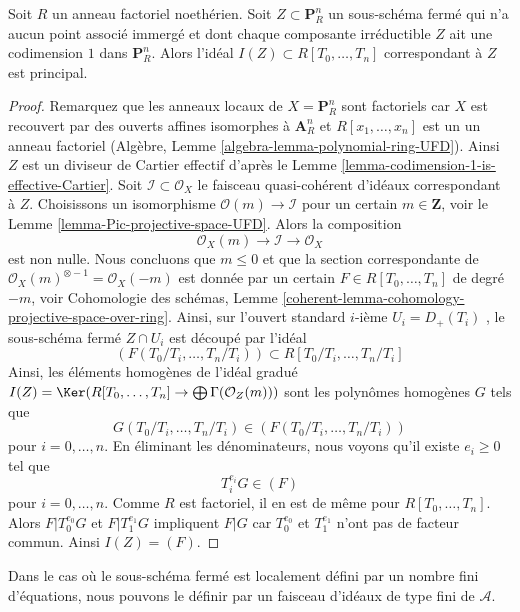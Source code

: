 \begin{lemma}
\label{lemma-equation-codim-1-in-projective-space}
Soit  $R$  un anneau factoriel noethérien. Soit  $Z \subset \mathbf{P}^n_R$  un sous-schéma fermé qui
n'a aucun point associé immergé et dont chaque composante irréductible
 $Z$  ait une codimension  $1$  dans  $\mathbf{P}^n_R$. Alors l'idéal
 $I(Z) \subset R[T_0, \ldots, T_n]$  correspondant à  $Z$  est principal.
\end{lemma}

\begin{proof}
Remarquez que les anneaux locaux de  $X = \mathbf{P}^n_R$  sont factoriels car  $X$  est
recouvert par des ouverts affines isomorphes à  $\mathbf{A}^n_R$  et  $R[x_1, \ldots, x_n]$  est un
un anneau factoriel (Algèbre, Lemme  \ref{algebra-lemma-polynomial-ring-UFD}). Ainsi  $Z$  est un diviseur de Cartier
effectif d'après le Lemme  \ref{lemma-codimension-1-is-effective-Cartier}. Soit  $\mathcal{I} \subset \mathcal{O}_X$  le faisceau
quasi-cohérent d'idéaux correspondant à  $Z$. Choisissons un isomorphisme
 $\mathcal{O}(m) \to \mathcal{I}$  pour un certain  $m \in \mathbf{Z}$, voir le Lemme  \ref{lemma-Pic-projective-space-UFD}. Alors la
composition
$$
\mathcal{O}_X(m) \to \mathcal{I} \to \mathcal{O}_X
$$
est non nulle. Nous concluons que  $m \leq 0$  et que la section correspondante de
 $\mathcal{O}_X(m)^{\otimes -1} = \mathcal{O}_X(-m)$  est donnée par un certain  $F \in R[T_0, \ldots, T_n]$  de degré  $-m$, voir
Cohomologie des schémas, Lemme  \ref{coherent-lemma-cohomology-projective-space-over-ring}. Ainsi, sur l'ouvert standard
 $i$-ième  $U_i = D_+(T_i)$ , le sous-schéma fermé  $Z \cap U_i$  est découpé par
l'idéal
$$
(F(T_0/T_i, \ldots, T_n/T_i)) \subset R[T_0/T_i, \ldots, T_n/T_i]
$$
Ainsi, les éléments homogènes de l'idéal gradué  $I(Z) = \Ker(R[T_0, \ldots, T_n] \to \bigoplus \Gamma(\mathcal{O}_Z(m)))$  sont les
polynômes homogènes  $G$  tels que
$$
G(T_0/T_i, \ldots, T_n/T_i) \in (F(T_0/T_i, \ldots, T_n/T_i))
$$
pour  $i = 0, \ldots, n$. En éliminant les dénominateurs, nous voyons qu'il existe
 $e_i \geq 0$  tel que
$$
T_i^{e_i}G \in (F)
$$
pour  $i = 0, \ldots, n$. Comme  $R$  est factoriel, il en est de même pour
 $R[T_0, \ldots, T_n]$. Alors  $F | T_0^{e_0}G$  et  $F | T_1^{e_1}G$  impliquent  $F | G$  car
 $T_0^{e_0}$  et  $T_1^{e_1}$  n'ont pas de facteur commun. Ainsi  $I(Z) = (F)$.
\end{proof}

\noindent
Dans le cas où le sous-schéma fermé est localement défini par un nombre fini
d'équations, nous pouvons le définir par un faisceau d'idéaux de type fini de
 $\mathcal{A}$.

